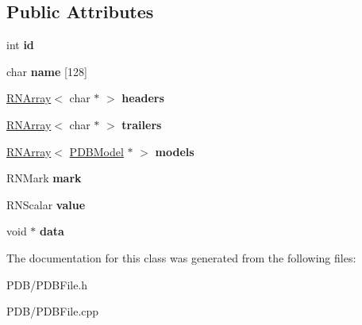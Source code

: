 \subsection*{Public Attributes}
\begin{DoxyCompactItemize}
\item 
int {\bfseries id}\hypertarget{class_p_d_b_file_a731e8c53a4172a1ff10113082ad7ec35}{}\label{class_p_d_b_file_a731e8c53a4172a1ff10113082ad7ec35}

\item 
char {\bfseries name} \mbox{[}128\mbox{]}\hypertarget{class_p_d_b_file_aa69b009ca999e92cb59b23adcb3273d5}{}\label{class_p_d_b_file_aa69b009ca999e92cb59b23adcb3273d5}

\item 
\hyperlink{class_r_n_array}{R\+N\+Array}$<$ char $\ast$ $>$ {\bfseries headers}\hypertarget{class_p_d_b_file_a4b69194044ef5103a18ce7334593eb2b}{}\label{class_p_d_b_file_a4b69194044ef5103a18ce7334593eb2b}

\item 
\hyperlink{class_r_n_array}{R\+N\+Array}$<$ char $\ast$ $>$ {\bfseries trailers}\hypertarget{class_p_d_b_file_a577f84dbaf12a28903a7f10064cfffc2}{}\label{class_p_d_b_file_a577f84dbaf12a28903a7f10064cfffc2}

\item 
\hyperlink{class_r_n_array}{R\+N\+Array}$<$ \hyperlink{class_p_d_b_model}{P\+D\+B\+Model} $\ast$ $>$ {\bfseries models}\hypertarget{class_p_d_b_file_a1d8acb51a856235d033f60661d5bbaec}{}\label{class_p_d_b_file_a1d8acb51a856235d033f60661d5bbaec}

\item 
R\+N\+Mark {\bfseries mark}\hypertarget{class_p_d_b_file_a0fa6b72d6baabea53325dbe0b5d3b22d}{}\label{class_p_d_b_file_a0fa6b72d6baabea53325dbe0b5d3b22d}

\item 
R\+N\+Scalar {\bfseries value}\hypertarget{class_p_d_b_file_ab5b5a88e908d8fab8e015e43f81a1eb9}{}\label{class_p_d_b_file_ab5b5a88e908d8fab8e015e43f81a1eb9}

\item 
void $\ast$ {\bfseries data}\hypertarget{class_p_d_b_file_a1540dd091331d1cd4cb560e728aef779}{}\label{class_p_d_b_file_a1540dd091331d1cd4cb560e728aef779}

\end{DoxyCompactItemize}


The documentation for this class was generated from the following files\+:\begin{DoxyCompactItemize}
\item 
P\+D\+B/P\+D\+B\+File.\+h\item 
P\+D\+B/P\+D\+B\+File.\+cpp\end{DoxyCompactItemize}
